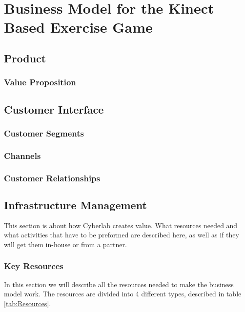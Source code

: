 \chapter{Business Model for the Kinect Based Exercise Game}
\section{Product}
\subsection{Value Proposition}
\section{Customer Interface}
\subsection{Customer Segments}
\subsection{Channels}
\subsection{Customer Relationships}
\section{Infrastructure Management}
This section is about how Cyberlab creates value. What resources needed and what activities that have to be preformed are described here, as well as if they will get them in-house or from a partner. 

\subsection{Key Resources}

In this section we will describe all the resources needed to make the business model work. The resources are divided into 4 different types, described in table \ref{tab:Resources}.
\newpage

